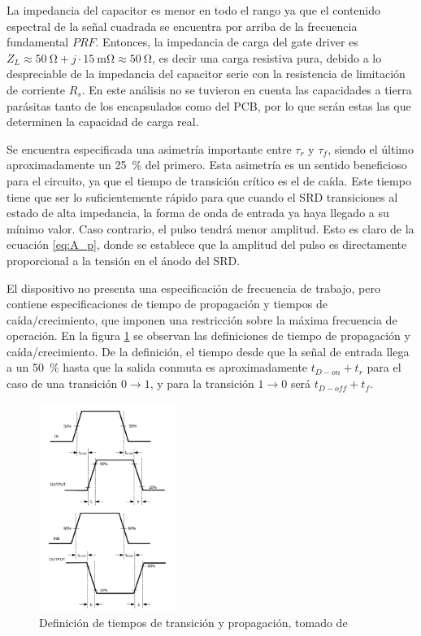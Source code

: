 La impedancia del capacitor es menor en todo el rango ya que el contenido
espectral de la señal cuadrada se encuentra por arriba de la frecuencia
fundamental $PRF$. Entonces, la impedancia de carga del gate driver es $Z_L
\approx \qty{50}{\ohm} + j \cdot \qty{15}{\milli\ohm} \approx \qty{50}{\ohm}$,
es decir una carga resistiva pura, debido a lo despreciable de la impedancia del
capacitor serie con la resistencia de limitación de corriente $R_s$. En este
análisis no se tuvieron en cuenta las capacidades a tierra parásitas tanto de
los encapsulados como del PCB, por lo que serán estas las que determinen la
capacidad de carga real.

Se encuentra especificada una asimetría importante entre $\tau_r$ y $\tau_f$,
siendo el último aproximadamente un \qty{25}{\percent} del primero. Esta
asimetría es un sentido beneficioso para el circuito, ya que el tiempo de
transición crítico es el de caída. Este tiempo tiene que ser lo suficientemente
rápido para que cuando el SRD transiciones al estado de alta impedancia, la forma
de onda de entrada ya haya llegado a su mínimo valor. Caso contrario, el pulso
tendrá menor amplitud. Esto es claro de la ecuación \ref{eq:A_p}, donde se
establece que la amplitud del pulso es directamente proporcional a la tensión en
el ánodo del SRD.

El dispositivo no presenta una especificación de frecuencia de trabajo, pero
contiene especificaciones de tiempo de propagación y tiempos de
caída/crecimiento, que imponen una restricción sobre la máxima frecuencia de
operación. En la figura \ref{fig:lm5114_timing_definitions} se observan las
definiciones de tiempo de propagación y caída/crecimiento. De la definición, el
tiempo desde que la señal de entrada llega a un \qty{50}{\percent} hasta que la
salida conmuta es aproximadamente $t_{D-on}+t_{r}$ para el caso de una
transición $0\to1$, y para la transición $1\to0$ será $t_{D-off}+t_{f}$.

\begin{figure}[tbp]
    \centering
    \includegraphics[width=0.4\textwidth]{images/lm5114_timing_definitions.png}
    \caption{Definición de tiempos de transición y propagación, tomado de
    \cite{LM5114_datasheet}}
    \label{fig:lm5114_timing_definitions}
\end{figure}

